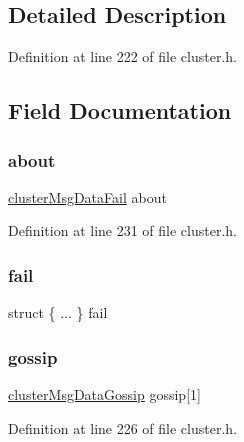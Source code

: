 \subsection{Detailed Description}


Definition at line 222 of file cluster.\+h.



\subsection{Field Documentation}
\mbox{\label{unioncluster_msg_data_afcb3336ec3ec8c832bbd6616470f0536}} 
\subsubsection{\texorpdfstring{about}{about}}
{\footnotesize\ttfamily \hyperlink{structcluster_msg_data_fail}{cluster\+Msg\+Data\+Fail} about}



Definition at line 231 of file cluster.\+h.

\mbox{\label{unioncluster_msg_data_ac6c2ee2b22c450e5ebc8461ff9b84dc1}} 
\subsubsection{\texorpdfstring{fail}{fail}}
{\footnotesize\ttfamily struct \{ ... \}   fail}

\mbox{\label{unioncluster_msg_data_a947036ec4730e07dd6bf6afcfd2943c4}} 
\subsubsection{\texorpdfstring{gossip}{gossip}}
{\footnotesize\ttfamily \hyperlink{structcluster_msg_data_gossip}{cluster\+Msg\+Data\+Gossip} gossip\mbox{[}1\mbox{]}}



Definition at line 226 of file cluster.\+h.

